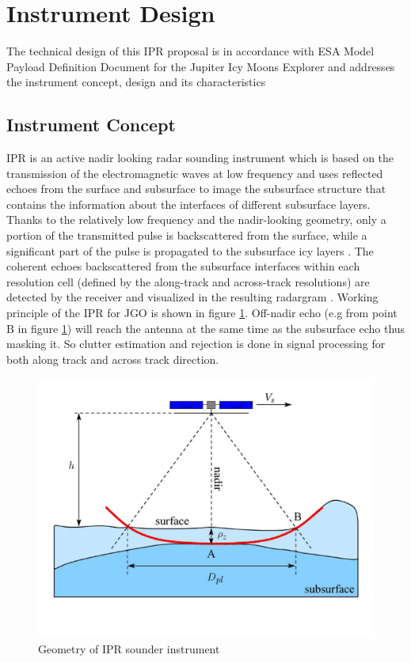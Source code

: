 \section{Instrument Design}
\label{IPR_design}
The technical design of this \ac{IPR} proposal is in accordance with ESA Model Payload Definition Document for the Jupiter Icy Moons Explorer \cite{JGO_Payload_def} and addresses the instrument concept, design and its characteristics 
\subsection{Instrument Concept}
\ac{IPR} is an active nadir looking radar sounding instrument which is based on the transmission of the electromagnetic waves at low frequency and uses reflected echoes from the surface and subsurface to image the subsurface structure that contains the information about the interfaces of different subsurface layers. Thanks to the relatively low frequency and the nadir-looking geometry, only a portion of the transmitted pulse is backscattered from the surface, while a significant part of the pulse is propagated to the subsurface icy layers \cite{Gany_SRS}. The coherent echoes backscattered from the subsurface interfaces within each resolution cell (defined by the along-track and across-track resolutions) are detected by the receiver and visualized in the resulting radargram \cite{Gany_SRS}. Working principle of the \ac{IPR} for \ac{JGO} is shown in figure \ref{fig:IPR_concept}. Off-nadir echo (e.g from point B in figure \ref{fig:IPR_concept}) will reach the antenna at the same time as the subsurface echo thus masking it. So clutter estimation and rejection is done in signal processing for both along track and across track direction.\\
%
\begin{figure}[bht]
\centering
\includegraphics[scale=0.5]{Figures/IPR_Concept.pdf}
\caption{Geometry of \ac{IPR} sounder instrument \cite{Gany_SRS}} 
\label{fig:IPR_concept}
\end{figure}
%
